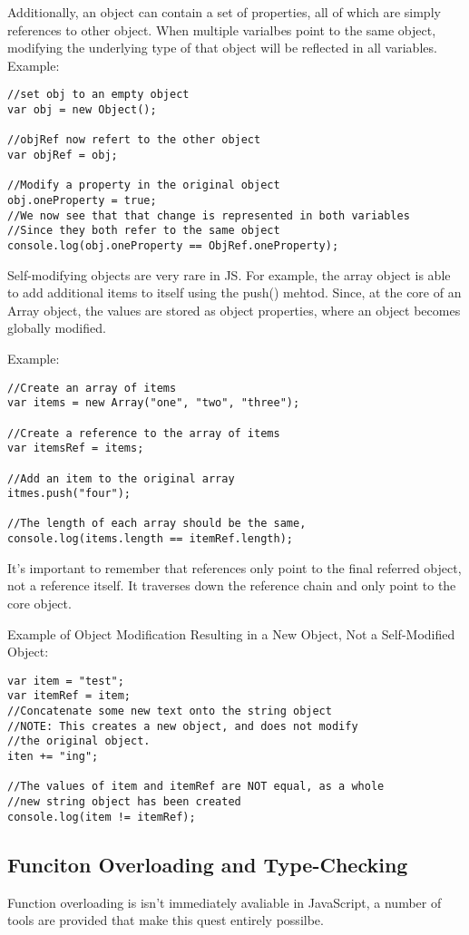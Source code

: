 \documentclass[a4paper,11pt]{book}
\begin{document}
Additionally, an object can contain a set of properties, all of which are simply
references to other object. When multiple varialbes point to the same object,
modifying the underlying type of that object will be reflected in all variables.
Example:
\begin{verbatim}
//set obj to an empty object
var obj = new Object();

//objRef now refert to the other object
var objRef = obj;

//Modify a property in the original object
obj.oneProperty = true;
//We now see that that change is represented in both variables
//Since they both refer to the same object
console.log(obj.oneProperty == ObjRef.oneProperty);
\end{verbatim}

Self-modifying objects are very rare in JS. For example, the array object is
able to add additional items to itself using the push() mehtod. Since, at the
core of an Array object, the values are stored as object properties, where an
object becomes globally modified. 

Example:
\begin{verbatim}
//Create an array of items
var items = new Array("one", "two", "three");

//Create a reference to the array of items
var itemsRef = items;

//Add an item to the original array
itmes.push("four");

//The length of each array should be the same,
console.log(items.length == itemRef.length);
\end{verbatim}

It's important to remember that references only point to the final referred
object, not a reference itself. It traverses down the reference chain and only
point to the core object.

Example of Object Modification Resulting in a New Object, Not a Self-Modified
Object:
\begin{verbatim}
var item = "test";
var itemRef = item;
//Concatenate some new text onto the string object
//NOTE: This creates a new object, and does not modify
//the original object.
iten += "ing";

//The values of item and itemRef are NOT equal, as a whole
//new string object has been created
console.log(item != itemRef);
\end{verbatim}

\subsection{Funciton Overloading and Type-Checking}
Function overloading is isn't immediately avaliable in JavaScript, a number of
tools are provided that make this quest entirely possilbe.
\end{document}
